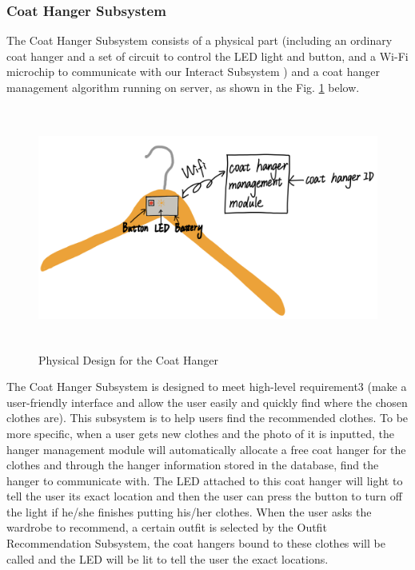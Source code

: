 \subsubsection{Coat Hanger Subsystem}
The Coat Hanger Subsystem consists of a physical part (including an ordinary coat hanger and a set of circuit to control the LED light and button, and a Wi-Fi microchip to communicate with our Interact Subsystem ) and a coat hanger management algorithm running on server, as shown in the Fig. \ref{coathanger} below.
\begin{figure}[h]
   \centering
   \includegraphics[width=14cm,height=8cm]{graph/Physical design for coat hanger.jpeg}
   \caption{Physical Design for the Coat Hanger}
   \label{coathanger}
   \end{figure}
 
The Coat Hanger Subsystem is designed to meet high-level requirement3 (make a user-friendly interface and allow the user easily and quickly find where the chosen clothes are). This subsystem is to help users find the recommended clothes. To be more specific, when a user gets new clothes and the photo of it is inputted, the hanger management module will automatically allocate a free coat hanger for the clothes and through the hanger information stored in the database, find the hanger to communicate with. The LED attached to this coat hanger will light to tell the user its exact location and then the user can press the button to turn off the light if he/she finishes putting his/her clothes. When the user asks the wardrobe to recommend, a certain outfit is selected by the Outfit Recommendation Subsystem, the coat hangers bound to these clothes will be called and the LED will be lit to tell the user the exact locations.  

